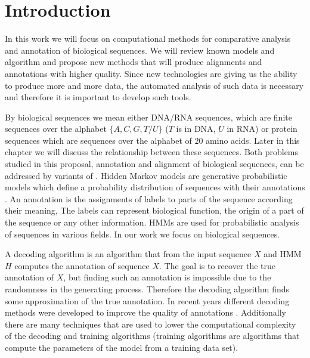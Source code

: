 \chapter{Introduction}


In this work we will focus on computational methods for comparative analysis
and annotation of biological sequences. We will review known models and
algorithm and propose new methods that will produce
alignments and annotations with higher quality. Since new technologies are
giving us the ability to produce more and more data, the automated analysis of such
data is necessary and therefore it is important to develop such tools.

By biological sequences we mean either DNA/RNA sequences, which are finite
sequences over the alphabet $\{A,C,G,T/U\}$ ($T$ is in DNA, $U$ in RNA) or 
protein sequences which are sequences over the alphabet of $20$ amino acids.
Later in this chapter we will discuss the relationship between these sequences.
Both 
problems studied in this proposal, annotation and alignment of biological
sequences, can be addressed by variants of .
Hidden Markov models are generative probabilistic models which define a
probability distribution of sequences with their annotations 
\cite{Durbin1998}. An annotation is
the assignments of labels to parts of the sequence according their meaning, The
labels can represent biological function,
the origin of a part of the sequence or any other information. HMMs are used
for probabilistic analysis of sequences in various fields. In our work
we focus on  biological sequences. 

A decoding algorithm is an algorithm that from the input sequence $X$ and HMM
$H$ computes the annotation of sequence $X$. The goal is to recover the true
annotation of $X$, but finding such an annotation is impossible due to the
randomness in the generating process. Therefore the decoding algorithm finds
some approximation of the true annotation.  In recent years different decoding
methods were developed to improve the quality of annotations
\cite{Gross2007,Nanasi2010,Nanasi2010mgr,Truszkowski2011}.  Additionally there
are many techniques that are used to lower the computational complexity of the
decoding and training algorithms (training algorithms are algorithms that
compute the parameters of the model from a training data set).

